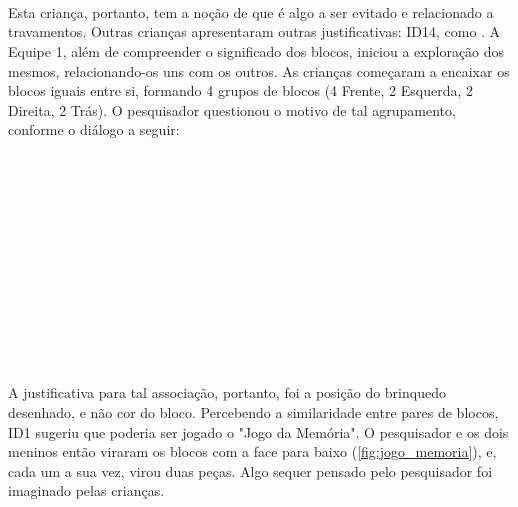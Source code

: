 \begin{dialogo}
     \\
     \\
     \\
     
\end{dialogo}

Esta criança, portanto, tem a noção de que  é algo a ser evitado e relacionado a travamentos. Outras crianças apresentaram outras justificativas: ID14, como . A Equipe 1, além de compreender o significado dos blocos, iniciou a exploração dos mesmos, relacionando-os uns com os outros. As crianças começaram a encaixar os blocos iguais entre si, formando 4 grupos de blocos (4 Frente, 2 Esquerda, 2 Direita, 2 Trás). O pesquisador questionou o motivo de tal agrupamento, conforme o diálogo a seguir:

\begin{dialogo}
     \\
     \\
     \\
     \\
     \\
      \\
      \\
     \\
     \\
     \\
     \\
\end{dialogo}

A justificativa para tal associação, portanto, foi a posição do brinquedo desenhado, e não cor do bloco. Percebendo a similaridade entre pares de blocos, ID1 sugeriu que poderia ser jogado o "Jogo da Memória". O pesquisador e os dois meninos então viraram os blocos com a face para baixo (\autoref{fig:jogo_memoria}), e, cada um a sua vez, virou duas peças. Algo sequer pensado pelo pesquisador foi imaginado pelas crianças.

